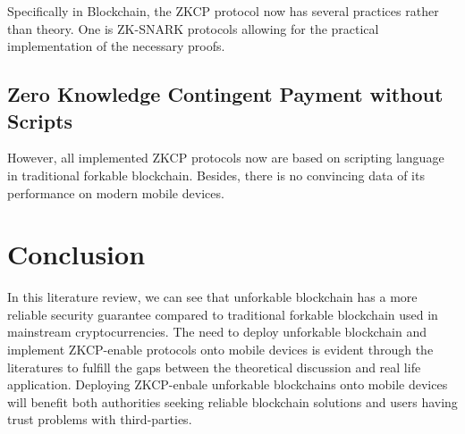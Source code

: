 \documentclass[12pt]{article}
\begin{document}
Specifically in Blockchain, the ZKCP protocol now has several practices rather than theory. One is ZK-SNARK protocols allowing for the practical implementation of the necessary proofs.

\subsection{Zero Knowledge Contingent Payment without Scripts}

However, all implemented ZKCP protocols now are based on scripting language in traditional forkable blockchain. Besides, there is no convincing data of its performance on modern mobile devices.

\section{Conclusion}

In this literature review, we can see that unforkable blockchain has a more reliable security guarantee compared to traditional forkable blockchain used in mainstream cryptocurrencies. The need to deploy unforkable blockchain and implement ZKCP-enable protocols onto mobile devices is evident through the literatures to fulfill the gaps between the theoretical discussion and real life application. Deploying ZKCP-enbale unforkable blockchains onto mobile devices will benefit both authorities seeking reliable blockchain solutions and users having trust problems with third-parties.

\newpage


\end{document}
